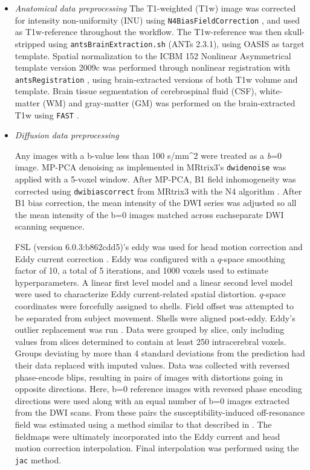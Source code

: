 \documentclass[10pt,letterpaper]{article}
\begin{document}
\begin{enumerate}
\begin{itemize}

\item {\it Anatomical data preprocessing}
The T1-weighted (T1w) image was corrected for intensity non-uniformity
(INU) using \texttt{N4BiasFieldCorrection} \cite[ANTs 2.3.1]{n4}, and
used as T1w-reference throughout the workflow. The T1w-reference was
then skull-stripped using \texttt{antsBrainExtraction.sh} (ANTs 2.3.1),
using OASIS as target template. Spatial normalization to the ICBM 152
Nonlinear Asymmetrical template version 2009c
\cite[RRID:SCR\_008796]{mni} was performed through nonlinear
registration with \texttt{antsRegistration} \cite[ANTs 2.3.1,
RRID:SCR\_004757]{ants}, using brain-extracted versions of both T1w
volume and template. Brain tissue segmentation of cerebrospinal fluid
(CSF), white-matter (WM) and gray-matter (GM) was performed on the
brain-extracted T1w using \texttt{FAST} \cite[FSL 6.0.3:b862cdd5,
RRID:SCR\_002823]{fsl_fast}.

\item {\it Diffusion data preprocessing}

Any images with a b-value less than 100 s/mm\^{}2 were treated as a
\emph{b}=0 image. MP-PCA denoising as implemented in MRtrix3's
\texttt{dwidenoise}\cite{dwidenoise1} was applied with a 5-voxel
window. After MP-PCA, B1 field inhomogeneity was corrected using
\texttt{dwibiascorrect} from MRtrix3 with the N4 algorithm \cite{n4}.
After B1 bias correction, the mean intensity of the DWI series was
adjusted so all the mean intensity of the b=0 images matched across
eachseparate DWI scanning sequence.

FSL (version 6.0.3:b862cdd5)'s eddy was used for head motion correction
and Eddy current correction \cite{anderssoneddy}. Eddy was configured
with a \(q\)-space smoothing factor of 10, a total of 5 iterations, and
1000 voxels used to estimate hyperparameters. A linear first level model
and a linear second level model were used to characterize Eddy
current-related spatial distortion. \(q\)-space coordinates were
forcefully assigned to shells. Field offset was attempted to be
separated from subject movement. Shells were aligned post-eddy. Eddy's
outlier replacement was run \cite{eddyrepol}. Data were grouped by
slice, only including values from slices determined to contain at least
250 intracerebral voxels. Groups deviating by more than 4 standard
deviations from the prediction had their data replaced with imputed
values. Data was collected with reversed phase-encode blips, resulting
in pairs of images with distortions going in opposite directions. Here,
b=0 reference images with reversed phase encoding directions were used
along with an equal number of b=0 images extracted from the DWI scans.
From these pairs the susceptibility-induced off-resonance field was
estimated using a method similar to that described in \cite{topup}. The
fieldmaps were ultimately incorporated into the Eddy current and head
motion correction interpolation. Final interpolation was performed using
the \texttt{jac} method.


\end{itemize}
\end{enumerate}
\end{document}
